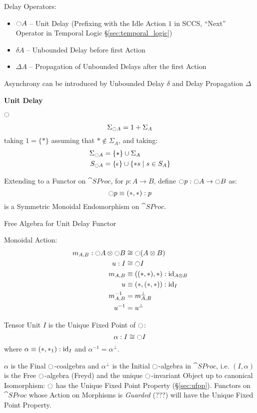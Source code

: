 Delay Operators:
\begin{itemize}
  \item $\ocircle A$ -- Unit Delay (Prefixing with the Idle Action $1$
    in SCCS, ``Next'' Operator in Temporal Logic
    \S\ref{sec:temporal_logic})
  \item $\delta A$ -- Unbounded Delay before first Action
  \item $\Delta A$ -- Propagation of Unbounded Delays after the first
    Action
\end{itemize}

Asynchrony can be introduced by Unbounded Delay
$\delta$ and Delay Propagation $\Delta$


\textbf{Unit Delay}

$\ocircle$

\[
  \Sigma_{\ocircle A} = 1 + \Sigma_A
\]
taking $1 = \{*\}$ assuming that $* \notin \Sigma_A$, and taking:
\begin{align*}
  \Sigma_{\ocircle A} &= \{*\} \cup \Sigma_A \\
  S_{\ocircle A} &= \{\epsilon\} \cup \{*s \mid s \in S_A\}
\end{align*}

Extending to a Functor on $\cat{SProc}$, for $p : A \rightarrow B$,
define $\ocircle p : \ocircle A \rightarrow \ocircle B$ as:
\[
  \ocircle p \equiv (*,*):p
\]
is a Symmetric Monoidal Endomorphism on $\cat{SProc}$.

Free Algebra for Unit Delay Functor

Monoidal Action:
\begin{align*}
  m_{A,B} : \ocircle A \otimes \ocircle B
    &\cong \ocircle(A \otimes B) \\
  u : I &\cong \ocircle I \\
  m_{A,B} &\equiv ((*,*),*) : \mathrm{id}_{A \otimes B} \\
  u &\equiv (*,(*,*)) : \mathrm{id}_I \\
  m_{A,B}^{-1} &= m_{A,B}^\bot \\
  u^{-1} &= u^\bot
\end{align*}

Tensor Unit $I$ is the Unique Fixed Point of $\ocircle$:
\[
  \alpha : I \cong \ocircle I
\]
where $\alpha \equiv (*,*_1):\mathrm{id}_I$ and $\alpha^{-1} = \alpha^\bot$.

$\alpha$ is the Final $\ocircle$-coalgebra and $\alpha^\bot$ is the
Initial $\ocircle$-algebra in $\cat{SProc}$, i.e. $(I,\alpha)$ is the
Free $\ocircle$-algebra (Freyd) and the unique $\ocircle$-invariant
Object up to canonical Isomorphism: $\ocircle$ has the Unique Fixed
Point Property (\S\ref{sec:ufpp}). Functors on $\cat{SProc}$ whose
Action on Morphisms is \emph{Guarded} (???) will have the Unique
Fixed Point Property. %

